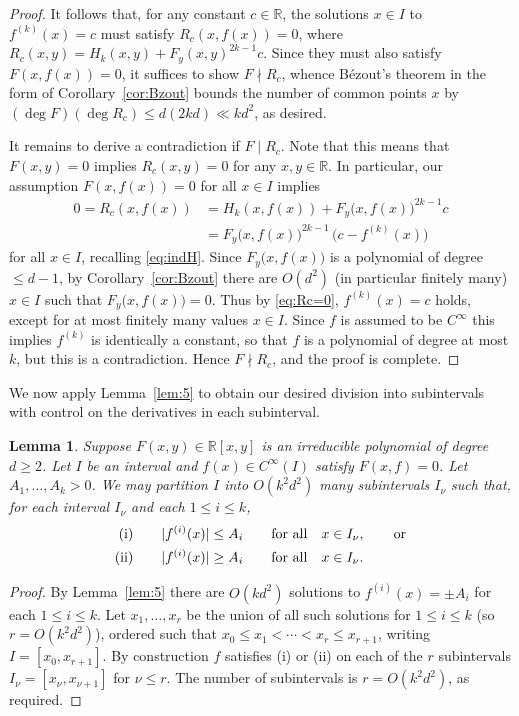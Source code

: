 \documentclass[12pt]{amsart}
\newcommand{\R}{{\mathbb R}}
\newcommand{\1}{{\mathbf 1}}
\newtheorem{lemma}[theorem]{Lemma}
\theoremstyle{remark}
\theoremstyle{definition}
\begin{document}
\begin{proof}
It follows that, for any constant $c\in \R$, the solutions $x\in I$ to $f^{(k)}(x)=c$ must satisfy $R_c(x,f(x))=0$, where $R_c(x,y)=H_k(x,y)+ F_y(x,y)^{2k-1}c$. Since they must also satisfy $F(x,f(x))=0$, it suffices to show $F\nmid R_c$, whence B\'ezout's theorem in the form of Corollary~\ref{cor:Bzout} bounds the number of common points $x$ by $(\deg F)(\deg R_c)\le d(2kd)\ll kd^2$, as desired.

It remains to derive a contradiction if $F\mid R_c$. Note that this means that $F(x,y)=0$ implies $R_c(x,y)=0$ for any $x,y\in \R$. In particular, our assumption $F(x,f(x))=0$ for all $x\in I$ implies
\begin{align}\label{eq:Rc=0}
0=R_c(x,f(x)) &= H_k(x,f(x))+ F_y\big(x,f(x)\big)^{2k-1}c \nonumber\\
&= F_y\big(x,f(x)\big)^{2k-1}\,\big(c-f^{(k)}(x)\big)
\end{align}
for all $x\in I$, recalling \eqref{eq:indH}. Since $F_y\big(x,f(x)\big)$ is a polynomial of degree $\leq d-1$, by Corollary~\ref{cor:Bzout} there are $O(d^2)$ (in particular finitely many) $x\in I$ such that $F_y\big(x,f(x)\big)=0$. 
Thus by \eqref{eq:Rc=0}, $f^{(k)}(x) = c$ holds, except for at most finitely many values $x \in I$. Since $f$ is assumed to be $C^\infty$ this implies $f^{(k)}$ is identically a constant, so that $f$ is a polynomial of degree at most $k$, but this is a contradiction. Hence $F\nmid R_c$, and the proof is complete.
\end{proof}

We now apply Lemma~\ref{lem:5} to obtain our desired division into subintervals with control on the derivatives in each subinterval.
\begin{lemma}\label{lem:6}
Suppose $F(x,y)\in\R[x,y]$ is an irreducible polynomial of degree $d\ge2$. Let $I$ be an interval and $f(x)\in C^\infty(I)$ satisfy $F(x,f)=0$. Let $A_1,\ldots,A_k>0$. We may partition $I$ into $O(k^2d^2)$ many subintervals $I_\nu$ such that, for each interval $I_\nu$ and each $1\leq i\leq k$,
\begin{align*}
{\rm (i)}&\qquad |f^{(i)}(x)| \le A_i \qquad {\rm for \ all }\quad x\in I_\nu, \qquad {\rm or}\\
{\rm (ii)}&\qquad |f^{(i)}(x)| \ge A_i \qquad {\rm for \ all }\quad x\in I_\nu.
\end{align*}
\end{lemma}
\begin{proof}
By Lemma~\ref{lem:5} there are $O(kd^2)$ solutions to $f^{(i)}(x) = \pm A_i$ for each $1\leq i\leq k$. Let $x_1,\ldots,x_r$ be the union of all such solutions for $1\leq i\leq k$ (so $r=O(k^2d^2)$), ordered such that $x_0\leq x_1<\cdots<x_r\leq x_{r+1}$, writing $I=[x_0,x_{r+1}]$. By construction $f$ satisfies (i) or (ii) on each of the $r$ subintervals $I_\nu = [x_{\nu},x_{\nu+1}]$ for $\nu\leq  r$. The number of subintervals is $r=O(k^2d^2)$, as required.
\end{proof}
\end{document}

